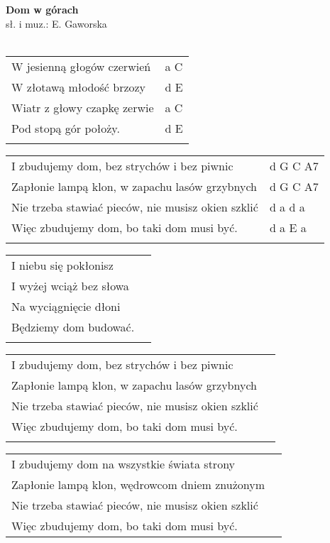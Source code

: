 \documentclass[a5paper]{article}
\begin{document}


\noindent
\fontsize{12pt}{15pt}\selectfont
\textbf{Dom w górach} \\
\fontsize{8pt}{10pt}\selectfont
sł. i muz.: E. Gaworska \\ \\
\fontsize{10pt}{12pt}\selectfont
{}
\begin{tabular}{@{}p{9.00cm}p{3cm}@{}}
\noindent
W jesienną głogów czerwień & a C \\
W złotawą młodość brzozy & d E \\
Wiatr z głowy czapkę zerwie & a C \\
Pod stopą gór położy. & d E \\ \\
\end{tabular}

\noindent
\begin{tabular}{@{}p{8.00cm}p{3cm}@{}}
I zbudujemy dom, bez strychów i bez piwnic & d G C A7 \\
Zapłonie lampą klon, w zapachu lasów grzybnych & d G C A7 \\
Nie trzeba stawiać pieców, nie musisz okien szklić & d a d a \\
Więc zbudujemy dom, bo taki dom musi być. & d a E a \\ \\
\end{tabular}

\noindent
\begin{tabular}{@{}p{8.00cm}p{3cm}@{}}
I niebu się pokłonisz \\
I wyżej wciąż bez słowa \\
Na wyciągnięcie dłoni \\
Będziemy dom budować. \\ \\
\end{tabular}

\noindent
\begin{tabular}{@{}p{8.00cm}p{3cm}@{}}
I zbudujemy dom, bez strychów i bez piwnic \\
Zapłonie lampą klon, w zapachu lasów grzybnych \\
Nie trzeba stawiać pieców, nie musisz okien szklić\\
Więc zbudujemy dom, bo taki dom musi być.\\ \\
\end{tabular}

\noindent
\begin{tabular}{@{}p{8.00cm}p{3cm}@{}}
I zbudujemy dom na wszystkie świata strony \\
Zapłonie lampą klon, wędrowcom dniem znużonym \\
Nie trzeba stawiać pieców, nie musisz okien szklić\\
Więc zbudujemy dom, bo taki dom musi być.\\
\end{tabular}
\end{document}
